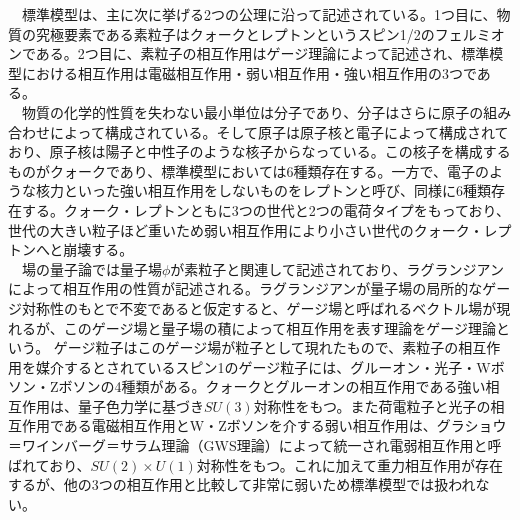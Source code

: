 　標準模型は、主に次に挙げる2つの公理に沿って記述されている。1つ目に、物質の究極要素である素粒子はクォークとレプトンというスピン1/2のフェルミオンである。2つ目に、素粒子の相互作用はゲージ理論によって記述され、標準模型における相互作用は電磁相互作用・弱い相互作用・強い相互作用の3つである。\\
　物質の化学的性質を失わない最小単位は分子であり、分子はさらに原子の組み合わせによって構成されている。そして原子は原子核と電子によって構成されており、原子核は陽子と中性子のような核子からなっている。この核子を構成するものがクォークであり、標準模型においては6種類存在する。一方で、電子のような核力といった強い相互作用をしないものをレプトンと呼び、同様に6種類存在する。クォーク・レプトンともに3つの世代と2つの電荷タイプをもっており、世代の大きい粒子ほど重いため弱い相互作用により小さい世代のクォーク・レプトンへと崩壊する。\\
　場の量子論では量子場$\phi$が素粒子と関連して記述されており、ラグランジアンによって相互作用の性質が記述される。ラグランジアンが量子場の局所的なゲージ対称性のもとで不変であると仮定すると、ゲージ場と呼ばれるベクトル場が現れるが、このゲージ場と量子場の積によって相互作用を表す理論をゲージ理論という。
ゲージ粒子はこのゲージ場が粒子として現れたもので、素粒子の相互作用を媒介するとされているスピン1のゲージ粒子には、グルーオン・光子・Wボソン・Zボソンの4種類がある。クォークとグルーオンの相互作用である強い相互作用は、量子色力学に基づき$SU(3)$対称性をもつ。また荷電粒子と光子の相互作用である電磁相互作用とW・Zボソンを介する弱い相互作用は、グラショウ＝ワインバーグ＝サラム理論（GWS理論）によって統一され電弱相互作用と呼ばれており、$SU(2)\times U(1)$対称性をもつ。これに加えて重力相互作用が存在するが、他の3つの相互作用と比較して非常に弱いため標準模型では扱われない。\\
